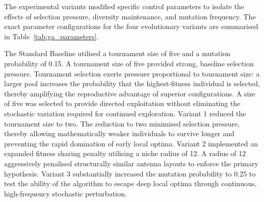 \documentclass[conference]{IEEEtran}
\begin{document}
The experimental variants modified specific control parameters to isolate the effects of 
selection pressure, diversity maintenance, and mutation frequency. The exact parameter 
configurations for the four evolutionary variants are summarised in Table~\ref{tab:ga_parameters}. 

\begin{table}[htbp]
    \centering
    \caption{Control parameters applied to the genetic algorithm variants during the empirical evaluation.}
    \label{tab:ga_parameters}
    \setlength{\tabcolsep}{4pt}
    \renewcommand{\arraystretch}{1.05}
    \footnotesize
\end{table}

The Standard Baseline utilised a tournament size of five and a mutation probability of 0.15. A tournament size of five provided strong, 
baseline selection pressure. Tournament selection exerts pressure proportional to tournament size: a larger pool increases the probability 
that the highest-fitness individual is selected, thereby amplifying the reproductive advantage of superior configurations. A size of five was 
selected to provide directed exploitation without eliminating the stochastic variation required for continued exploration. Variant 1 reduced the tournament size to two. The reduction to two minimised selection pressure, 
thereby allowing mathematically weaker individuals to survive longer and preventing the rapid domination of early local optima. 
Variant 2 implemented an expanded fitness sharing penalty utilising a niche radius of 12. A radius of 12 aggressively penalised 
structurally similar antenna layouts to enforce the primary hypothesis. Variant 3 substantially increased the mutation probability 
to 0.25 to test the ability of the algorithm to escape deep local optima through continuous, high-frequency stochastic perturbation.
\end{document}
